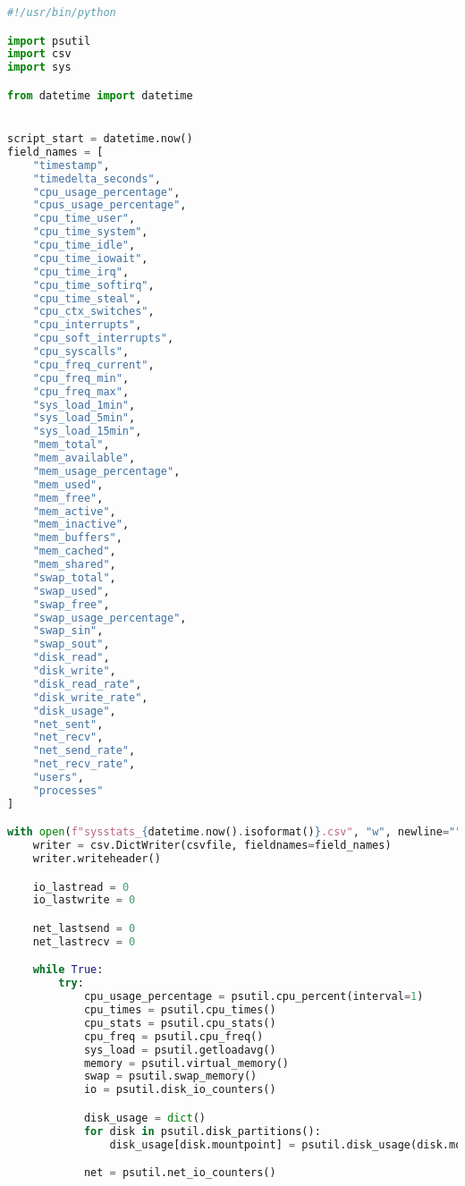 \begin{lstlisting}[caption={A monitorozáshoz készített, psutil csomagot használó Python-script, mely csv formátumban menti el a metrikákat.},label=lst:python-sysstats,language=Python]
#!/usr/bin/python

import psutil
import csv
import sys

from datetime import datetime


script_start = datetime.now()
field_names = [
    "timestamp",
    "timedelta_seconds",
    "cpu_usage_percentage",
    "cpus_usage_percentage",
    "cpu_time_user",
    "cpu_time_system",
    "cpu_time_idle",
    "cpu_time_iowait",
    "cpu_time_irq",
    "cpu_time_softirq",
    "cpu_time_steal",
    "cpu_ctx_switches",
    "cpu_interrupts",
    "cpu_soft_interrupts",
    "cpu_syscalls",
    "cpu_freq_current",
    "cpu_freq_min",
    "cpu_freq_max",
    "sys_load_1min",
    "sys_load_5min",
    "sys_load_15min",
    "mem_total",
    "mem_available",
    "mem_usage_percentage",
    "mem_used",
    "mem_free",
    "mem_active",
    "mem_inactive",
    "mem_buffers",
    "mem_cached",
    "mem_shared",
    "swap_total",
    "swap_used",
    "swap_free",
    "swap_usage_percentage",
    "swap_sin",
    "swap_sout",
    "disk_read",
    "disk_write",
    "disk_read_rate",
    "disk_write_rate",
    "disk_usage",
    "net_sent",
    "net_recv",
    "net_send_rate",
    "net_recv_rate",
    "users",
    "processes"
]

with open(f"sysstats_{datetime.now().isoformat()}.csv", "w", newline="") as csvfile:
    writer = csv.DictWriter(csvfile, fieldnames=field_names)
    writer.writeheader()

    io_lastread = 0
    io_lastwrite = 0

    net_lastsend = 0
    net_lastrecv = 0

    while True:
        try:
            cpu_usage_percentage = psutil.cpu_percent(interval=1)
            cpu_times = psutil.cpu_times()
            cpu_stats = psutil.cpu_stats()
            cpu_freq = psutil.cpu_freq()
            sys_load = psutil.getloadavg()
            memory = psutil.virtual_memory()
            swap = psutil.swap_memory()
            io = psutil.disk_io_counters()

            disk_usage = dict()
            for disk in psutil.disk_partitions():
                disk_usage[disk.mountpoint] = psutil.disk_usage(disk.mountpoint).percent

            net = psutil.net_io_counters()


\end{lstlisting}
